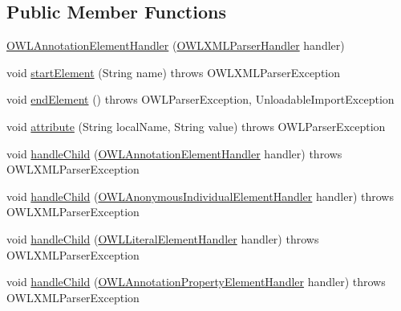 \subsection*{Public Member Functions}
\begin{DoxyCompactItemize}
\item 
\hyperlink{classorg_1_1coode_1_1owlapi_1_1owlxmlparser_1_1_o_w_l_annotation_element_handler_a5f9b516e5d07515cbd53277851aa2aee}{O\-W\-L\-Annotation\-Element\-Handler} (\hyperlink{classorg_1_1coode_1_1owlapi_1_1owlxmlparser_1_1_o_w_l_x_m_l_parser_handler}{O\-W\-L\-X\-M\-L\-Parser\-Handler} handler)
\item 
void \hyperlink{classorg_1_1coode_1_1owlapi_1_1owlxmlparser_1_1_o_w_l_annotation_element_handler_a00b48ec8585832e016520e36cb1c6efe}{start\-Element} (String name)  throws O\-W\-L\-X\-M\-L\-Parser\-Exception 
\item 
void \hyperlink{classorg_1_1coode_1_1owlapi_1_1owlxmlparser_1_1_o_w_l_annotation_element_handler_acad41e60103992b44ffa1bceca4de8d1}{end\-Element} ()  throws O\-W\-L\-Parser\-Exception, Unloadable\-Import\-Exception 
\item 
void \hyperlink{classorg_1_1coode_1_1owlapi_1_1owlxmlparser_1_1_o_w_l_annotation_element_handler_aa2f72417c13d565a3228d45b8479f055}{attribute} (String local\-Name, String value)  throws O\-W\-L\-Parser\-Exception 
\item 
void \hyperlink{classorg_1_1coode_1_1owlapi_1_1owlxmlparser_1_1_o_w_l_annotation_element_handler_a238e268baee78b0c21f39f98f9d0c5ba}{handle\-Child} (\hyperlink{classorg_1_1coode_1_1owlapi_1_1owlxmlparser_1_1_o_w_l_annotation_element_handler}{O\-W\-L\-Annotation\-Element\-Handler} handler)  throws O\-W\-L\-X\-M\-L\-Parser\-Exception 
\item 
void \hyperlink{classorg_1_1coode_1_1owlapi_1_1owlxmlparser_1_1_o_w_l_annotation_element_handler_adc568263156e72ef13ec6d7983c92879}{handle\-Child} (\hyperlink{classorg_1_1coode_1_1owlapi_1_1owlxmlparser_1_1_o_w_l_anonymous_individual_element_handler}{O\-W\-L\-Anonymous\-Individual\-Element\-Handler} handler)  throws O\-W\-L\-X\-M\-L\-Parser\-Exception 
\item 
void \hyperlink{classorg_1_1coode_1_1owlapi_1_1owlxmlparser_1_1_o_w_l_annotation_element_handler_ae9b059780f736f88e1cb83426b7ac7d0}{handle\-Child} (\hyperlink{classorg_1_1coode_1_1owlapi_1_1owlxmlparser_1_1_o_w_l_literal_element_handler}{O\-W\-L\-Literal\-Element\-Handler} handler)  throws O\-W\-L\-X\-M\-L\-Parser\-Exception 
\item 
void \hyperlink{classorg_1_1coode_1_1owlapi_1_1owlxmlparser_1_1_o_w_l_annotation_element_handler_ac2969f7b2eab4df0506e057fe6bda2e3}{handle\-Child} (\hyperlink{classorg_1_1coode_1_1owlapi_1_1owlxmlparser_1_1_o_w_l_annotation_property_element_handler}{O\-W\-L\-Annotation\-Property\-Element\-Handler} handler)  throws O\-W\-L\-X\-M\-L\-Parser\-Exception 

\end{DoxyCompactItemize}
